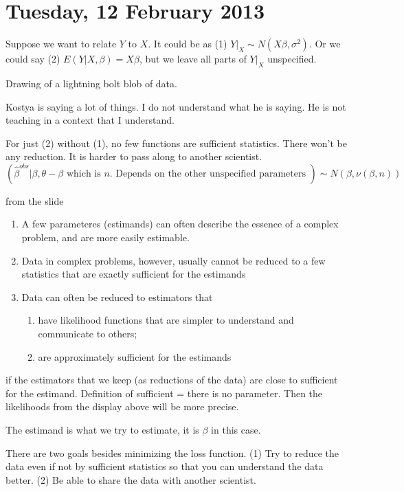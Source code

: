\documentclass[letterpaper, 12pt]{article}
\theoremstyle{definition}
\theoremstyle{plain}
\begin{document}
\section{Tuesday, 12 February 2013}
Suppose we want to relate $Y$ to $X$. It could be as (1) $Y|_X \sim N(X\beta, \sigma^2)$. Or we could say (2) $E(Y | X, \beta) = X \beta$, but we leave all parts of $Y|_X$ unspecified.

Drawing of a lightning bolt blob of data.

Kostya is saying a lot of things. I do not understand what he is saying. He is not teaching in a context that I understand.

For just (2) without (1), no few functions are sufficient statistics. There won't be any reduction. It is harder to pass along to another scientist.
\[
(\hat{\beta}^{obs} | \beta, \theta - \beta \text{ which is $n$. Depends on the other unspecified parameters } )
\sim N(\beta, \nu(\beta, n))
\]

from the slide
\begin{enumerate}
\item
A few parameteres (estimands) can often describe the essence of a complex problem, and are more easily estimable.

\item 
Data in complex problems, however, usually cannot be reduced to a few statistics that are exactly sufficient for the estimands

\item
Data can often be reduced to estimators that 
\begin{enumerate}
\item
have likelihood functions that are simpler to understand and communicate to others;

\item are approximately sufficient for the estimands
\end{enumerate}
\end{enumerate}

if the estimators that we keep (as reductions of the data) are close to sufficient for the estimand. Definition of sufficient = there is no parameter. Then the likelihoods from the display above will be more precise.

The estimand is what we try to estimate, it is $\beta$ in this case.

There are two goals besides minimizing the loss function. (1) Try to reduce the data even if not by sufficient statistics so that you can understand the data better. (2) Be able to share the data with another scientist.
\end{document}
